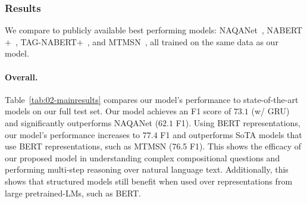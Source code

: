 \documentclass[main.tex]{subfiles}
\begin{document}
\subsubsection{Results}
\label{sssec:results}
We compare to publicly available best performing models: NAQANet~\cite{drop-2019}, NABERT$\text{+}$~\cite{nabert-2019}, TAG-NABERT$+$~\cite{tagbert-2019}, and MTMSN~\cite{mtmsn-2019}, all trained on the same data as our model.

\paragraph{Overall.} Table~\ref{tab:02-mainresults} compares our model's performance to state-of-the-art models on our full test set.
Our model achieves an F1 score of $73.1$ (w/ GRU) and significantly outperforms NAQANet ($62.1$ F1).
Using BERT representations, our model's performance increases to $77.4$ F1 and outperforms SoTA models that use BERT representations, such as MTMSN (76.5 F1).
This shows the efficacy of our proposed model in understanding complex compositional questions and performing multi-step reasoning over natural language text. Additionally, this shows that structured models still benefit when used over representations from large pretrained-LMs, such as BERT.
\end{document}
